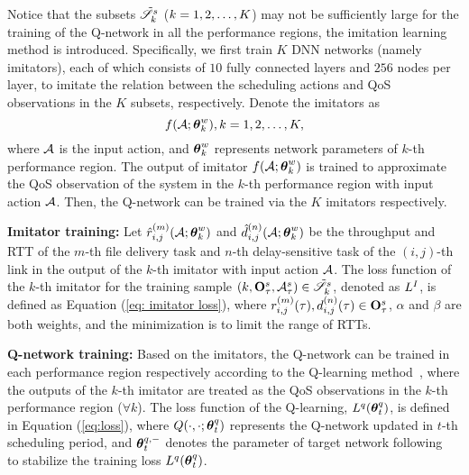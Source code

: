 Notice that the subsets $\Tilde{\mathscr{S}}^{s}_k$ ($k=1, 2, \ldots, K$) may not be sufficiently large for the training of the Q-network in all the performance regions, the imitation learning method is introduced. Specifically, we first train $K$ DNN networks (namely imitators), each of which consists of $10$ fully connected layers and $256$ nodes per layer, to imitate the relation between the scheduling actions and QoS observations in the $K$ subsets, respectively. Denote the imitators as $$f(\mathcal{A}; \boldsymbol{\theta}^w_k), k=1, 2, \ldots, K,$$ where $\mathcal{A}$ is the input action, and $\boldsymbol{\theta}^w_k$ represents network parameters of $k$-th performance region. The output of imitator $f(\mathcal{A}; \boldsymbol{\theta}^w_k)$ is trained to approximate the QoS observation of the system in the $k$-th performance region with input action $\mathcal{A}$. Then, the Q-network can be trained via the $K$ imitators respectively.


{\bf Imitator training:} Let $\hat{r}_{i,j}^{(m)}(\mathcal{A}; \boldsymbol{\theta}^w_k)$ and $\hat{d}_{i,j}^{(n)}(\mathcal{A}; \boldsymbol{\theta}^w_k)$ be the throughput and RTT of the ${m}$-th file delivery task and ${n}$-th delay-sensitive task of the $(i,j)$-th link in the output of the $k$-th imitator with input action $\mathcal{A}$.
The loss function of the $k$-th imitator for the training sample $(k,\mathbf{O}^{s}_\tau, \mathcal{A}^{s}_\tau) \in \Tilde{\mathscr{S}}^{s}_k$, denoted as $L^I$, is defined as Equation (\ref{eq: imitator loss}), where $r^{(m)}_{i,j}(\tau),d^{(n)}_{i,j}(\tau) \in \mathbf{O}_{\tau}^s$,  $\alpha$ and $\beta$ are both weights, and the minimization is to limit the range of RTTs.

{\bf Q-network training:}  Based on the imitators, the Q-network can be trained in each performance region respectively according to the Q-learning method~\cite{mnih2015human}, where the outputs of the $k$-th imitator are treated as the QoS observations in the $k$-th performance region ($\forall k$). The loss function of the Q-learning, $L^q(\boldsymbol{\theta}^q_t)$, is defined in Equation (\ref{eq:loss}), where $Q(\cdot, \cdot; \boldsymbol{\theta}^q_{t})$ represents the Q-network updated in $t$-th scheduling period, and $\boldsymbol{\theta}^{q,-}_t$ denotes the parameter of target network following~\cite{mnih2015human} to stabilize the training loss $L^q(\boldsymbol{\theta}^q_t)$. 

